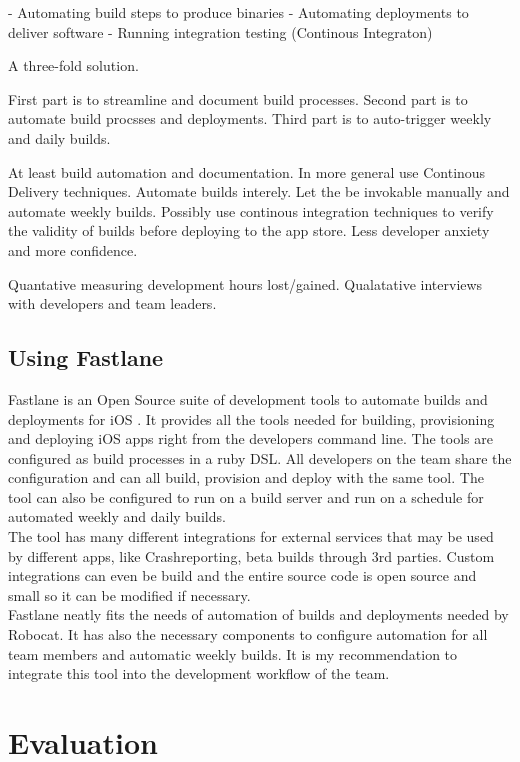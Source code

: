 \documentclass{ituthesis}
\begin{document}
- Automating build steps to produce binaries
- Automating deployments to deliver software
- Running integration testing (Continous Integraton)

A three-fold solution.

First part is to streamline and document build processes.
Second part is to automate build procsses and deployments.
Third part is to auto-trigger weekly and daily builds.



At least build automation and documentation. In more general use Continous Delivery techniques. Automate builds interely. Let the be invokable manually and automate weekly builds. Possibly use continous integration techniques to verify the validity of builds before deploying to the app store. Less developer anxiety and more confidence.

Quantative measuring development hours lost/gained. Qualatative interviews with developers and team leaders.

\section{Using Fastlane}

Fastlane is an Open Source suite of development tools to automate builds and deployments for iOS \cite{Krause2015}. It provides all the tools needed for building, provisioning and deploying iOS apps right from the developers command line. The tools are configured as build processes in a ruby DSL. All developers on the team share the configuration and can all build, provision and deploy with the same tool. The tool can also be configured to run on a build server and run on a schedule for automated weekly and daily builds.\\

The tool has many different integrations for external services that may be used by different apps, like Crashreporting, beta builds through 3rd parties. Custom integrations can even be build and the entire source code is open source and small so it can be modified if necessary.\\

Fastlane neatly fits the needs of automation of builds and deployments needed by Robocat. It has also the necessary components to configure automation for all team members and automatic weekly builds. It is my recommendation to integrate this tool into the development workflow of the team.

\chapter{Evaluation}
\end{document}

